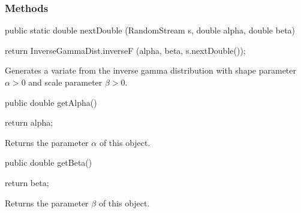 \subsubsection* {Methods}
\begin{code}

   public static double nextDouble (RandomStream s,
                                    double alpha, double beta)\begin{hide} {
      return InverseGammaDist.inverseF (alpha, beta, s.nextDouble());
   }\end{hide}
\end{code}
\begin{tabb} Generates a variate from the inverse gamma distribution
   with shape parameter $\alpha > 0$ and scale parameter $\beta > 0$.
\end{tabb}
\begin{code}

   public double getAlpha()\begin{hide} {
      return alpha;
   }\end{hide}
\end{code}
\begin{tabb} Returns the parameter $\alpha$ of this object.
\end{tabb}
\begin{code}

   public double getBeta()\begin{hide} {
      return beta;
   }\end{hide}
\end{code}
\begin{tabb} Returns the parameter $\beta$ of this object.
\end{tabb}
\begin{code}\begin{hide}

   protected void setParams (double alpha, double beta) {
      if (alpha <= 0.0)
         throw new IllegalArgumentException ("alpha <= 0");
      if (beta <= 0.0)
         throw new IllegalArgumentException ("beta <= 0");
      this.alpha = alpha;
      this.beta = beta;
   }
}\end{hide}
\end{code}
